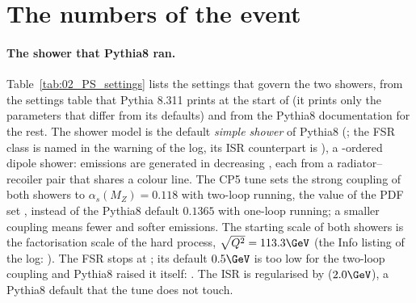 \section{The numbers of the event}
\label{sec:02_PS_numbers}

\paragraph{The shower that Pythia8 ran.} Table~\ref{tab:02_PS_settings} lists the settings that govern the two
showers, from the settings table that Pythia 8.311 prints at the start of  (it prints
only the parameters that differ from its defaults) and from the Pythia8 documentation for the rest. The shower
model is the default \emph{simple shower} of Pythia8 (; the FSR class
 is named in the warning of the log, its ISR counterpart is ), a \pt-ordered dipole shower:
emissions are generated in decreasing \pt, each from a radiator--recoiler pair that shares a colour line. The CP5
tune sets the strong coupling of both showers to $\alpha_s(M_Z) = 0.118$ with two-loop running, the value of the
PDF set , instead of the Pythia8 default $0.1365$ with one-loop running; a smaller
coupling means fewer and softer emissions. The starting scale of both showers is the factorisation scale of the
hard process, $\sqrt{Q^2} = 113.3\GeV$ (the Info listing of the log: ). The FSR stops at ; its default $0.5\GeV$ is too low for the two-loop coupling and
Pythia8 raised it itself: . The ISR is
regularised by  ($2.0\GeV$), a Pythia8 default that the tune does not touch.

